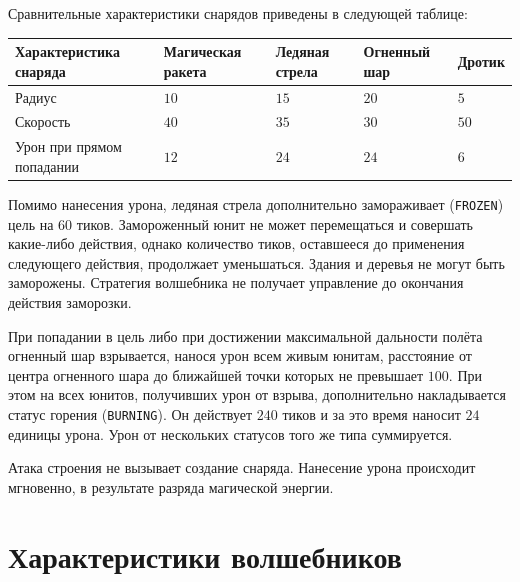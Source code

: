 Сравнительные характеристики снарядов приведены в следующей таблице:

\begin{tabular}{| l | l | l | l | l |}
  \hline
  Характеристика снаряда    & Магическая ракета & Ледяная стрела & Огненный шар          & Дротик \\
  \hline
  Радиус                    & $10$              & $15$           & $20$                  & $5$    \\
  Скорость                  & $40$              & $35$           & $30$                  & $50$   \\
  Урон при прямом попадании & $12$              & $24$           & $24$\footnotemark[11] & $6$    \\
  \hline
\end{tabular}


Помимо нанесения урона, ледяная стрела дополнительно замораживает (\texttt{FROZEN}) цель на $60$ тиков. Замороженный юнит не может
перемещаться и совершать какие-либо действия, однако количество тиков, оставшееся до применения следующего действия, продолжает уменьшаться.
Здания и деревья не могут быть заморожены. Стратегия волшебника не получает управление до окончания действия заморозки.

При попадании в цель либо при достижении максимальной дальности полёта огненный шар взрывается, нанося урон всем живым юнитам, расстояние от
центра огненного шара до ближайшей точки которых не превышает $100$. При этом на всех юнитов, получивших урон от взрыва, дополнительно
накладывается статус горения (\texttt{BURNING}). Он действует $240$ тиков и за это время наносит $24$ единицы урона. Урон от нескольких
статусов того же типа суммируется.

Атака строения не вызывает создание снаряда. Нанесение урона происходит мгновенно, в результате разряда магической энергии.

\section{Характеристики волшебников}

